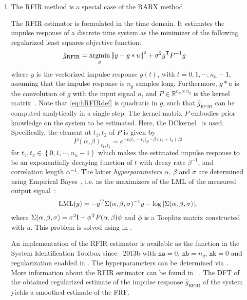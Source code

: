 \begin{enumerate}
\item \emph{}

The \gls{RFIR} method is a special case of the \gls{RARX} method. 

The \gls{RFIR} estimator is formulated in the time domain. 
It estimates the impulse response of a discrete time system as the minimizer of the following regularized least squares objective function:
\begin{align}\label{eq:hRFIRdef}
\hat g_{\mathrm{RFIR}} &= \operatorname*{argmin}_{g} \left\| y - g \ast u  \right\|_{}^2 + \sigma^2 g^{\mathrm{T}}P^{-1}g
\end{align}
where $g$ is the vectorized impulse response $g(t)$, with $t = 0,1,\cdots,n_h - 1$, assuming that the impulse response is $n_g$ samples long. 
Furthermore, $g\ast u$ is the convolution of $g$ with the input signal $u$, and $P\in \mathbb{R}^{n_g\times n_g}$ is the kernel matrix~\citep{Chen2012}. 
Note that \eqref{eq:hRFIRdef} is quadratic in $g$, such that $\hat g_{\mathrm{RFIR}}$ can be computed analytically in a single step.
The kernel matrix $P$ embodies prior knowledge on the system to be estimated. 
Here, the \gls{DCkernel}~\citep{Chen2012,Pillonetto2010} is used. 
Specifically, the element at $t_1,t_2$ of $P$ is given by
\begin{equation}
P(\alpha,\beta)_{t_1,t_2} = e^{-\alpha|t_1 - t_2|}e^{-\beta(t_1 + t_2)/2}
\end{equation}
 for $t_1,t_2 \in \left\{0,1,\cdots,n_h - 1\right\}$ which makes the estimated impulse response to be an exponentially decaying function of $t$ with decay rate $\beta^{-1}$, and correlation length $\alpha^{-1}$. 
 The latter \emph{hyperparameters} $\alpha$, $\beta$ and $\sigma$ are determined using Empirical Bayes~\citep{Carlin2000,Gelman2014}, i.e. as the maximizers of the \gls{LML} of the measured output signal~\citep{Chen2012}:
\begin{align}
\mathrm{LML}(y) = -y^{\mathrm{T}}\Sigma(\alpha,\beta,\sigma)^{-1}y - \log |\Sigma(\alpha,\beta,\sigma)| \text{,}
\end{align}
where $\Sigma(\alpha,\beta, \sigma) = \sigma^2 \mathrm{I} + \phi^{\mathrm{T}}P(\alpha,\beta)\phi$ and $\phi$ is a Toeplitz matrix constructed with $u$. 
This problem is solved using  in \MATLAB.

An implementation of the \gls{RFIR} estimator is available as the  function in the System Identification Toolbox since \MATLAB~2013b with $\mathtt{na} = 0$, $\mathtt{nb} = n_g$, $\mathtt{nk}=0$ and regularization enabled in . 
The hyperparameters can be determined via .
More information about the \gls{RFIR} estimator can be found in
~\citep{Pillonetto2010,Chen2012}. 
The \gls{DFT} of the obtained regularized estimate of the impulse response $\hat g_{\mathrm{RFIR}}$ of the system yields a smoothed estimate of the \gls{FRF}.
\end{enumerate}

